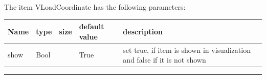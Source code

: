 The item VLoadCoordinate has the following parameters:\vspace{-1cm}\\ 
\begin{center}
  \footnotesize
  \begin{longtable}{| p{4.5cm} | p{2.5cm} | p{0.5cm} | p{2.5cm} | p{6cm} |}
    \hline
    \bf Name & \bf type & \bf size & \bf default value & \bf description \\ \hline
    show &     Bool &      &     True &     set true, if item is shown in visualization and false if it is not shown\\ \hline
	  \end{longtable}
	\end{center}
\par\noindent\rule{\textwidth}{0.4pt}
\label{description_LoadCoordinate}
